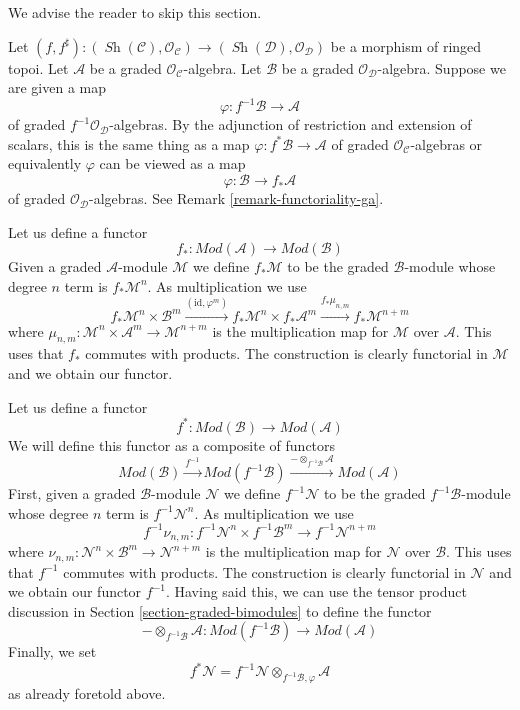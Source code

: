 \documentclass{stacks-project}
\theoremstyle{plain}
\theoremstyle{definition}
\theoremstyle{remark}
\numberwithin{equation}{subsection}
\def\Sh{\mathop{\mathit{Sh}}\nolimits}
\begin{document}
\noindent
We advise the reader to skip this section.

\medskip\noindent
Let $(f, f^\sharp) : (\Sh(\mathcal{C}), \mathcal{O}_\mathcal{C})
\to (\Sh(\mathcal{D}), \mathcal{O}_\mathcal{D})$
be a morphism of ringed topoi. Let $\mathcal{A}$ be a
graded $\mathcal{O}_\mathcal{C}$-algebra. Let $\mathcal{B}$ be a
graded $\mathcal{O}_\mathcal{D}$-algebra.
Suppose we are given a map
$$
\varphi : f^{-1}\mathcal{B} \to \mathcal{A}
$$
of graded $f^{-1}\mathcal{O}_\mathcal{D}$-algebras.
By the adjunction of restriction and extension of scalars, this
is the same thing as a map $\varphi : f^*\mathcal{B} \to \mathcal{A}$
of graded $\mathcal{O}_\mathcal{C}$-algebras or equivalently
$\varphi$ can be viewed as a map
$$
\varphi : \mathcal{B} \to f_*\mathcal{A}
$$
of graded $\mathcal{O}_\mathcal{D}$-algebras.
See Remark \ref{remark-functoriality-ga}.

\medskip\noindent
Let us define a functor
$$
f_* :
\textit{Mod}(\mathcal{A})
\longrightarrow
\textit{Mod}(\mathcal{B})
$$
Given a graded $\mathcal{A}$-module $\mathcal{M}$ we define
$f_*\mathcal{M}$ to be the graded $\mathcal{B}$-module
whose degree $n$ term is $f_*\mathcal{M}^n$. As multiplication
we use
$$
f_*\mathcal{M}^n \times \mathcal{B}^m
\xrightarrow{(\text{id}, \varphi^m)}
f_*\mathcal{M}^n \times f_*\mathcal{A}^m
\xrightarrow{f_*\mu_{n, m}}
f_*\mathcal{M}^{n + m}
$$
where $\mu_{n, m} : \mathcal{M}^n \times \mathcal{A}^m
\to \mathcal{M}^{n + m}$ is the multiplication map for $\mathcal{M}$
over $\mathcal{A}$. This uses that $f_*$ commutes with products.
The construction is clearly functorial in
$\mathcal{M}$ and we obtain our functor.

\medskip\noindent
Let us define a functor
$$
f^* :
\textit{Mod}(\mathcal{B})
\longrightarrow
\textit{Mod}(\mathcal{A})
$$
We will define this functor as a composite of functors
$$
\textit{Mod}(\mathcal{B})
\xrightarrow{f^{-1}}
\textit{Mod}(f^{-1}\mathcal{B})
\xrightarrow{ - \otimes_{f^{-1}\mathcal{B}} \mathcal{A}}
\textit{Mod}(\mathcal{A})
$$
First, given a graded $\mathcal{B}$-module $\mathcal{N}$ we define
$f^{-1}\mathcal{N}$ to be the graded $f^{-1}\mathcal{B}$-module
whose degree $n$ term is $f^{-1}\mathcal{N}^n$. As multiplication
we use
$$
f^{-1}\nu_{n, m} :
f^{-1}\mathcal{N}^n \times f^{-1}\mathcal{B}^m
\longrightarrow
f^{-1}\mathcal{N}^{n + m}
$$
where $\nu_{n, m} : \mathcal{N}^n \times \mathcal{B}^m
\to \mathcal{N}^{n + m}$ is the multiplication map for $\mathcal{N}$
over $\mathcal{B}$. This uses that $f^{-1}$ commutes with products.
The construction is clearly functorial in
$\mathcal{N}$ and we obtain our functor $f^{-1}$.
Having said this, we can use the tensor
product discussion in Section \ref{section-graded-bimodules}
to define the functor
$$
- \otimes_{f^{-1}\mathcal{B}} \mathcal{A} :
\textit{Mod}(f^{-1}\mathcal{B})
\longrightarrow
\textit{Mod}(\mathcal{A})
$$
Finally, we set
$$
f^*\mathcal{N} =
f^{-1}\mathcal{N} \otimes_{f^{-1}\mathcal{B}, \varphi} \mathcal{A}
$$
as already foretold above.
\end{document}
